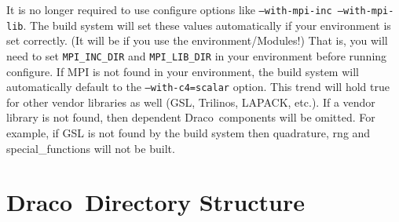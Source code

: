 \documentclass[note]{ResearchNote}
\newcommand{\draco}{Draco}
\begin{document}
It is no longer required to use configure options like
\texttt{--with-mpi-inc --with-mpi-lib}.  The build system will set
these values automatically if your environment is set correctly. (It
will be if you use the environment/Modules!)  That is, you will need
to set \texttt{MPI\_INC\_DIR} and \texttt{MPI\_LIB\_DIR} in your
environment before running configure.  If MPI is not found in your
environment, the build system will automatically default to the
\texttt{--with-c4=scalar} option.  This trend will hold true for other
vendor libraries as well (GSL, Trilinos, LAPACK, etc.).  If a vendor
library is not found, then dependent \draco\ components will be
omitted.  For example, if GSL is not found by the build system then
\textsf{quadrature}, \textsf{rng} and \textsf{special\_functions} will
not be built.


\section{\draco\ Directory Structure}
\end{document}
